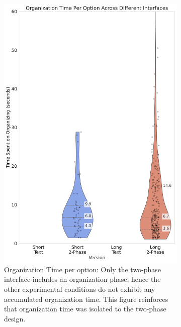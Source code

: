 \begin{figure}[htbp]
{\begin{minipage}{0.7\pdfpageheight}
            \begin{subfigure}[b]{0.24\pdfpageheight}
                \centering
                \includegraphics[width=\textwidth]{content/image/results/org_time_per_option.pdf}
                \captionsetup{width=0.87\textwidth}
                \caption{Organization Time per option: Only the two-phase interface includes an organization phase, hence the other experimental conditions do not exhibit any accumulated organization time. This figure reinforces that organization time was isolated to the two-phase design.}
                \label{fig:org_time}
            \end{subfigure}
            \begin{subfigure}[b]{0.24\pdfpageheight}
                \centering

\end{subfigure}
\end{minipage}}
\end{figure}
